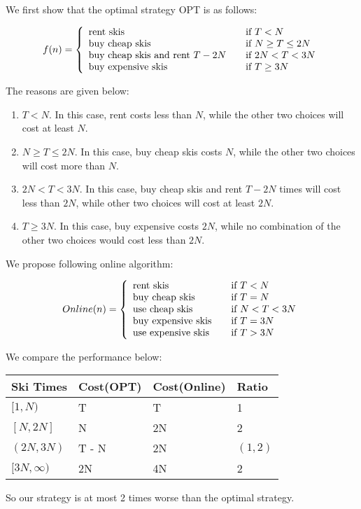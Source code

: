 We first show that the optimal strategy OPT is as follows:

\[ f(n) = \left\{
  \begin{array}{l l}
    \text{rent skis} & \quad \text{if $T < N$}  \\
    \text{buy cheap skis} & \quad \text{if $N \geq T \leq 2N$} \\
    \text{buy cheap skis and rent $T - 2N$} & \quad \text{if $2N < T < 3N$} \\
    \text{buy expensive skis} & \quad \text{if $T \geq 3N$}\\
  \end{array} \right.
\]

\noindent
The reasons are given below:

\begin{enumerate}
\item \textbf{$T < N$}. In this case, rent costs less than $N$, while the other two choices will cost at least $N$.

\item \textbf{$N \geq T \leq 2N$}. In this case, buy cheap skis costs $N$, while the other two choices will cost more than $N$.

\item \textbf{$2N < T < 3N$}. In this case, buy cheap skis and rent $T-2N$ times will cost less than $2N$, while other two choices will cost at least $2N$.

\item \textbf{$T \geq 3N$}. In this case, buy expensive costs $2N$, while no combination of the other two choices would cost less than $2N$.
\end{enumerate}

\noindent
We propose following online algorithm:

\[Online(n) = \left\{
  \begin{array}{l l}
    \text{rent skis} & \quad \text{if $T < N$}  \\
    \text{buy cheap skis} & \quad \text{if $T = N$}  \\
    \text{use cheap skis} & \quad \text{if $N < T < 3N$} \\
    \text{buy expensive skis} & \quad \text{if $T = 3N$} \\
    \text{use expensive skis} & \quad \text{if $T > 3N$}\\
  \end{array} \right.
\]

\noindent
We compare the performance below:

\begin{center}
\begin{tabular}{|l|l|l|l|}
  \hline
  Ski Times & Cost(OPT) & Cost(Online) & Ratio \\
  \hline
  $[1, N)$ & T & T & 1 \\
  \hline
  $[N, 2N]$ & N & 2N & 2 \\
  \hline
  $(2N, 3N)$ & T - N & 2N & $(1, 2)$ \\
  \hline
  $[3N, \infty)$ & 2N & 4N & 2 \\
  \hline
\end{tabular}
\end{center}

\noindent
So our strategy is at most 2 times worse than the optimal strategy.